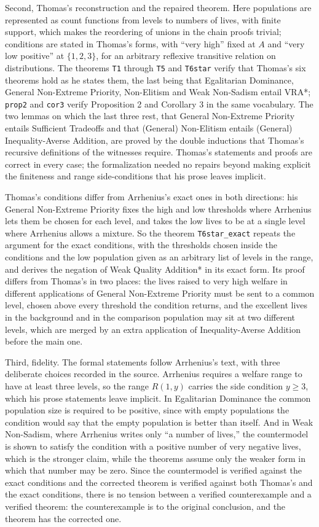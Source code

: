 \documentclass[
  11pt,
  letterpaper,
  DIV=11,
  numbers=noendperiod,
  twoside]{scrartcl}
\begin{document}
Second, Thomas's reconstruction and the repaired theorem. Here
populations are represented as count functions from levels to numbers of
lives, with finite support, which makes the reordering of unions in the
chain proofs trivial; conditions are stated in Thomas's forms, with
``very high'' fixed at \(A\) and ``very low positive'' at \(\{1,2,3\}\),
for an arbitrary reflexive transitive relation on distributions. The
theorems \texttt{T1} through \texttt{T5} and \texttt{T6star} verify that
Thomas's six theorems hold as he states them, the last being that
Egalitarian Dominance, General Non-Extreme Priority, Non-Elitism and
Weak Non-Sadism entail VRA*; \texttt{prop2} and \texttt{cor3} verify
Proposition 2 and Corollary 3 in the same vocabulary. The two lemmas on
which the last three rest, that General Non-Extreme Priority entails
Sufficient Tradeoffs and that (General) Non-Elitism entails (General)
Inequality-Averse Addition, are proved by the double inductions that
Thomas's recursive definitions of the witnesses require. Thomas's
statements and proofs are correct in every case; the formalization
needed no repairs beyond making explicit the finiteness and range
side-conditions that his prose leaves implicit.

Thomas's conditions differ from Arrhenius's exact ones in both
directions: his General Non-Extreme Priority fixes the high and low
thresholds where Arrhenius lets them be chosen for each level, and takes
the low lives to be at a single level where Arrhenius allows a mixture.
So the theorem \texttt{T6star\_exact} repeats the argument for the exact
conditions, with the thresholds chosen inside the conditions and the low
population given as an arbitrary list of levels in the range, and
derives the negation of Weak Quality Addition* in its exact form. Its
proof differs from Thomas's in two places: the lives raised to very high
welfare in different applications of General Non-Extreme Priority must
be sent to a common level, chosen above every threshold the condition
returns, and the excellent lives in the background and in the comparison
population may sit at two different levels, which are merged by an extra
application of Inequality-Averse Addition before the main one.

Third, fidelity. The formal statements follow Arrhenius's text, with
three deliberate choices recorded in the source. Arrhenius requires a
welfare range to have at least three levels, so the range \(R(1,y)\)
carries the side condition \(y \geq 3\), which his prose statements
leave implicit. In Egalitarian Dominance the common population size is
required to be positive, since with empty populations the condition
would say that the empty population is better than itself. And in Weak
Non-Sadism, where Arrhenius writes only ``a number of lives,'' the
countermodel is shown to satisfy the condition with a positive number of
very negative lives, which is the stronger claim, while the theorems
assume only the weaker form in which that number may be zero. Since the
countermodel is verified against the exact conditions and the corrected
theorem is verified against both Thomas's and the exact conditions,
there is no tension between a verified counterexample and a verified
theorem: the counterexample is to the original conclusion, and the
theorem has the corrected one.
\end{document}

